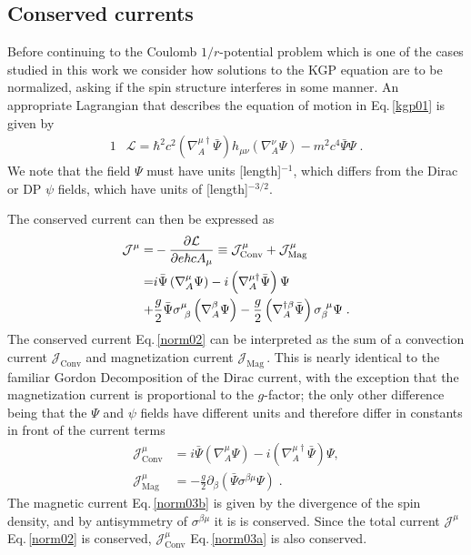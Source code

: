 \documentclass[epj]{svjour}
\begin{document}
\subsection{Conserved currents} \label{currents} %
Before continuing to the Coulomb $1/r$-potential problem which is one of the cases studied in this work we consider how solutions to the KGP equation are to be normalized, asking if the spin structure interferes in some manner. An appropriate Lagrangian that describes the equation of motion in Eq.\,\eqref{kgp01} is given by~\cite{DelgadoAcosta:2010nx}
\begin{alignat}{1}
\label{norm01} &\mathcal{L}=\hbar^{2}c^{2}\left(\nabla_{A}^{\mu\dag}\bar{\Psi}\right)h_{\mu\nu}\left(\nabla_{A}^{\nu}\Psi\right)-m^{2}c^{4}\bar{\Psi}\Psi\;.
\end{alignat}
We note that the field $\Psi$ must have units [length]$^{-1}$, which differs from the Dirac or DP $\psi$ fields, which have units of [length]$^{-3/2}$.

The conserved current can then be expressed as
\begin{alignat}{2}
\label{norm02} \mathcal{J}^{\mu}
=&-\frac{\partial\mathcal{L}}{\partial e\hbar cA_{\mu}}\equiv 
 \mathcal{J}^\mu_{\mathrm{Conv}}+\mathcal{J}^\mu_{\mathrm{Mag}} \\ \notag 
=&i\bar{\Psi}\left(\nabla_{A}^{\mu}\Psi\right)
 -i\left(\nabla_{A}^{\mu\dag}\bar{\Psi}\right)\Psi \\ \notag 
+&\frac{g}{2}\bar{\Psi}\sigma^{\mu}_{\ \beta}\left(\nabla_{A}^{\beta}\Psi\right)
 -\frac{g}{2}\left(\nabla_{A}^{\dag\beta}\bar{\Psi}\right)\sigma_{\beta}^{\ \mu}\Psi\;.
\end{alignat}
The conserved current Eq.\,\eqref{norm02} can be interpreted as the sum of a convection current $\mathcal{J}_{\mathrm{Conv}}$ and magnetization current $\mathcal{J}_{\mathrm{Mag}}$\,. This is nearly identical to the familiar Gordon Decomposition of the Dirac current, with the exception that the magnetization current is proportional to the $g$-factor; the only other difference being that the $\Psi$ and $\psi$ fields have different units and therefore differ in constants in front of the current terms
\begin{subequations}
\begin{alignat}{1}
\label{norm03a}\mathcal{J}^{\mu}_{\mathrm{Conv}}&=i\bar{\Psi}\left(\nabla_{A}^{\mu}\Psi\right)-i\left(\nabla_{A}^{\mu\dag}\bar{\Psi}\right)\Psi,\\
\label{norm03b} 
\mathcal{J}^{\mu}_{\mathrm{Mag}}&=-\frac{g}{2}\partial_{\beta}\left(\bar{\Psi}\sigma^{\beta\mu}\Psi\right)\;.
\end{alignat}
\end{subequations}
The magnetic current Eq.\,\eqref{norm03b} is given by the divergence of the spin density, and by antisymmetry of $\sigma^{\beta\mu}$ it is is conserved. Since the total current $\mathcal{J}^{\mu}$ Eq.\,\eqref{norm02} is conserved, $\mathcal{J}^{\mu}_{\mathrm{Conv}}$ Eq.\,\eqref{norm03a} is also conserved.
\end{document}
